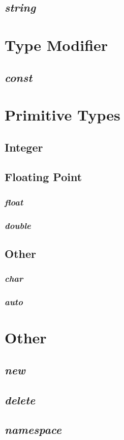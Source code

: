\documentclass[10pt,a4paper]{article}
\begin{document}
\subsection{\textit{string}}





\section{Type Modifier}


\subsection{\textit{const}}





\section{Primitive Types}


\subsection{Integer}


\subsection{Floating Point}

\subsubsection{\textit{float}}

\subsubsection{\textit{double}}


\subsection{Other}

\subsubsection{\textit{char}}

\subsubsection{\textit{auto}}





\section{Other}


\subsection{\textit{new}}


\subsection{\textit{delete}}


\subsection{\textit{namespace}}
\end{document}
